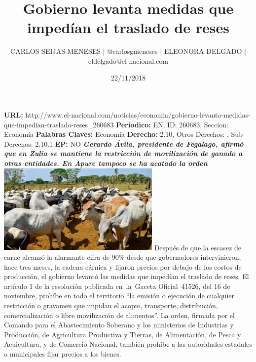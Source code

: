 \documentclass{article}%
\title{\textbf{Gobierno levanta medidas que impedían el traslado de reses}}%
\author{CARLOS SEIJAS MENESES | @carlosgmeneses | ELEONORA DELGADO | eldelgado@el{-}nacional.com}%
\date{22/11/2018}%
\begin{document}
%
\normalsize%
\maketitle%
\textbf{URL: }%
http://www.el{-}nacional.com/noticias/economia/gobierno{-}levanta{-}medidas{-}que{-}impedian{-}traslado{-}reses\_260683\newline%
%
\textbf{Periodico: }%
EN, %
ID: %
260683, %
Seccion: %
Economía\newline%
%
\textbf{Palabras Claves: }%
Economía\newline%
%
\textbf{Derecho: }%
2.10, %
Otros Derechos: %
, %
Sub Derechos: %
2.10.1\newline%
%
\textbf{EP: }%
NO\newline%
\newline%
%
\textbf{\textit{Gerardo Ávila, presidente de Fegalago, afirmó que en Zulia se mantiene la restricción de movilización de ganado a otras entidades. En Apure tampoco se ha acatado la orden}}%
\newline%
\newline%
%
\includegraphics[width=300px]{216.jpg}%
\newline%
%
Después de que la escasez de carne alcanzó la alarmante cifra de 90\% desde que gobernadores intervinieron, hace tres meses, la cadena cárnica y fijaron precios por debajo de los costos de producción, el gobierno levantó las medidas que impedían el traslado de reses.%
\newline%
%
El artículo 1 de la resolución publicada en~la~Gaceta Oficial~41526, del 16 de noviembre, prohíbe en todo el territorio “la emisión o ejecución de cualquier restricción o gravamen que impidan el acopio, transporte, distribución, comercialización o libre movilización de alimentos”.%
\newline%
%
La orden, firmada por el Comando para el Abastecimiento Soberano y los ministerios de Industrias y Producción, de Agricultura Productiva y Tierras, de Alimentación, de Pesca y Acuicultura, y de Comercio Nacional, también prohíbe a las autoridades estadales o municipales fijar precios a los bienes.%
\end{document}

